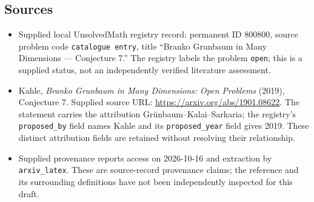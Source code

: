\documentclass[11pt]{article}
\begin{document}
\subsection{Sources}
\begin{itemize}
\item Supplied local UnsolvedMath registry record: permanent ID \(800800\), source problem code \texttt{catalogue entry}, title ``Branko Grunbaum in Many Dimensions --- Conjecture 7.'' The registry labels the problem \texttt{open}; this is a supplied status, not an independently verified literature assessment.
\item Kahle, \emph{Branko Grunbaum in Many Dimensions: Open Problems} (2019), Conjecture 7. Supplied source URL: \url{https://arxiv.org/abs/1901.08622}. The statement carries the attribution Gr\"unbaum--Kalai--Sarkaria; the registry's \texttt{proposed\_by} field names Kahle and its \texttt{proposed\_year} field gives 2019. These distinct attribution fields are retained without resolving their relationship.
\item Supplied provenance reports access on 2026-10-16 and extraction by \texttt{arxiv\_latex}. These are source-record provenance claims; the reference and its surrounding definitions have not been independently inspected for this draft.
\end{itemize}
\end{document}

